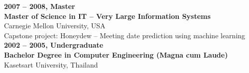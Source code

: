 \documentclass[margin, 10pt]{res} %
\begin{document}
\begin{resume}
\textbf{2007 -- 2008, Master} \\
\textbf{Master of Science in IT -- Very Large Information Systems}\\
Carnegie Mellon University, USA\\
Capstone project: Honeydew -- Meeting date prediction using machine learning \vspace{3mm} \\
\textbf{2002 -- 2005, Undergraduate }\\
\textbf{Bachelor Degree in Computer Engineering (Magna cum Laude)}\\
Kasetsart University, Thailand



\end{resume}
\end{document}

